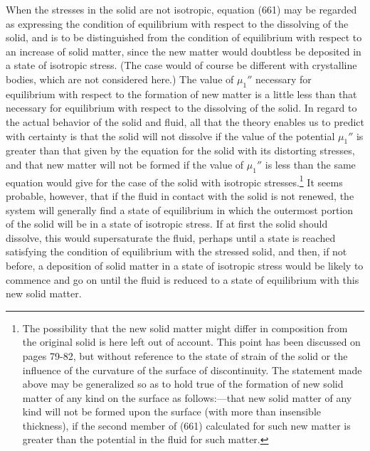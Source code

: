 \documentclass[12pt]{article}
\begin{document}
When the stresses in the solid are not isotropic, equation (661) may be regarded as expressing the condition of equilibrium with respect to the dissolving of the solid, and is to be distinguished from the condition of equilibrium with respect to an increase of solid matter, since the new matter would doubtless be deposited in a state of isotropic stress. (The case would of course be different with crystalline bodies, which are not considered here.) The value of $\mu_1''$ necessary for equilibrium with respect to the formation of new matter is a little less than that necessary for equilibrium with respect to the dissolving of the solid. In regard to the actual behavior of the solid and fluid, all that the theory enables us to predict with certainty is that the solid will not dissolve if the value of the potential $\mu_1''$ is greater than that given by the equation for the solid with its distorting stresses, and that new matter will not be formed if the value of $\mu_1''$ is less than the same equation would give for the case of the solid with isotropic stresses.\footnote{The possibility that the new solid matter might differ in composition from the original solid is here left out of account. This point has been discussed on pages 79-82, but without reference to the state of strain of the solid or the influence of the curvature of the surface of discontinuity. The statement made above may be generalized so as to hold true of the formation of new solid matter of any kind on the surface as follows:---that new solid matter of any kind will not be formed upon the surface (with more than insensible thickness), if the second member of (661) calculated for such new matter is greater than the potential in the fluid for such matter.} It seems probable, however, that if the fluid in contact with the solid is not renewed, the system will generally find a state of equilibrium in which the outermost portion of the solid will be in a state of isotropic stress. If at first the solid should dissolve, this would supersaturate the fluid, perhaps until a state is reached satisfying the condition of equilibrium with the stressed solid, and then, if not before, a deposition of solid matter in a state of isotropic stress would be likely to commence and go on until the fluid is reduced to a state of equilibrium with this new solid matter.
\end{document}
